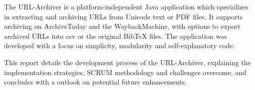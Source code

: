 The \gls{URL-Archiver} is a platform-independent Java application which specializes in extracting and archiving \glspl{URL} from Unicode text or PDF files. It supports archiving on \gls{ArchiveToday} and the \gls{WaybackMachine}, with options to export archived URLs into \gls{csv} or the original \gls{BibTeX} files. The application was developed with a focus on simplicity, modularity and self-explanatory code.

This report details the development process of the URL-Archiver, explaining the implementation strategies, \gls{SCRUM} methodology and challenges overcome, and concludes with a outlook on potential future enhancements.